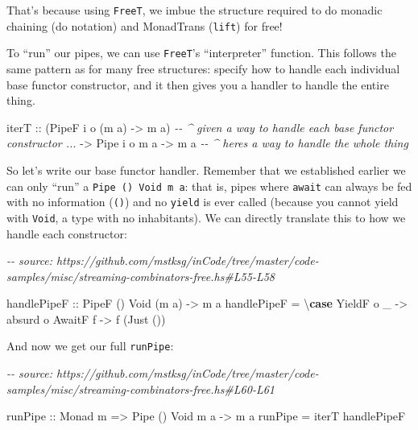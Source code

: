 \documentclass[]{article}
\newenvironment{Shaded}{}{}
\newcommand{\CommentTok}[1]{\textcolor[rgb]{0.38,0.63,0.69}{\textit{#1}}}
\newcommand{\DataTypeTok}[1]{\textcolor[rgb]{0.56,0.13,0.00}{#1}}
\newcommand{\KeywordTok}[1]{\textcolor[rgb]{0.00,0.44,0.13}{\textbf{#1}}}
\newcommand{\NormalTok}[1]{#1}
\newcommand{\OtherTok}[1]{\textcolor[rgb]{0.00,0.44,0.13}{#1}}
\begin{document}
That's because using \texttt{FreeT}, we imbue the structure required to do
monadic chaining (do notation) and MonadTrans (\texttt{lift}) for free!

To ``run'' our pipes, we can use \texttt{FreeT}'s ``interpreter'' function. This
follows the same pattern as for many free structures: specify how to handle each
individual base functor constructor, and it then gives you a handler to handle
the entire thing.

\begin{Shaded}
\begin{Highlighting}[]
\NormalTok{iterT}
\OtherTok{    ::}\NormalTok{ (}\DataTypeTok{PipeF}\NormalTok{ i o (m a) }\OtherTok{{-}>}\NormalTok{ m a)  }\CommentTok{{-}{-} \^{} given a way to handle each base functor constructor ...}
    \OtherTok{{-}>} \DataTypeTok{Pipe}\NormalTok{ i o m a }\OtherTok{{-}>}\NormalTok{ m a       }\CommentTok{{-}{-} \^{} here\textquotesingle{}s a way to handle the whole thing}
\end{Highlighting}
\end{Shaded}

So let's write our base functor handler. Remember that we established earlier we
can only ``run'' a \texttt{Pipe\ ()\ Void\ m\ a}: that is, pipes where
\texttt{await} can always be fed with no information (\texttt{()}) and no
\texttt{yield} is ever called (because you cannot yield with \texttt{Void}, a
type with no inhabitants). We can directly translate this to how we handle each
constructor:

\begin{Shaded}
\begin{Highlighting}[]
\CommentTok{{-}{-} source: https://github.com/mstksg/inCode/tree/master/code{-}samples/misc/streaming{-}combinators{-}free.hs\#L55{-}L58}

\OtherTok{handlePipeF ::} \DataTypeTok{PipeF}\NormalTok{ () }\DataTypeTok{Void}\NormalTok{ (m a) }\OtherTok{{-}>}\NormalTok{ m a}
\NormalTok{handlePipeF }\OtherTok{=}\NormalTok{ \textbackslash{}}\KeywordTok{case}
    \DataTypeTok{YieldF}\NormalTok{ o \_ }\OtherTok{{-}>}\NormalTok{ absurd o}
    \DataTypeTok{AwaitF}\NormalTok{ f   }\OtherTok{{-}>}\NormalTok{ f (}\DataTypeTok{Just}\NormalTok{ ())}
\end{Highlighting}
\end{Shaded}

And now we get our full \texttt{runPipe}:

\begin{Shaded}
\begin{Highlighting}[]
\CommentTok{{-}{-} source: https://github.com/mstksg/inCode/tree/master/code{-}samples/misc/streaming{-}combinators{-}free.hs\#L60{-}L61}

\OtherTok{runPipe ::} \DataTypeTok{Monad}\NormalTok{ m }\OtherTok{=>} \DataTypeTok{Pipe}\NormalTok{ () }\DataTypeTok{Void}\NormalTok{ m a }\OtherTok{{-}>}\NormalTok{ m a}
\NormalTok{runPipe }\OtherTok{=}\NormalTok{ iterT handlePipeF}
\end{Highlighting}
\end{Shaded}
\end{document}
